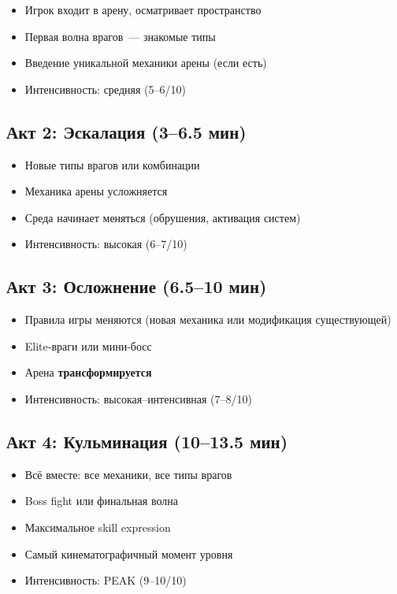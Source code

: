 \documentclass[a4paper,11pt]{report}
\begin{document}
\begin{itemize}[leftmargin=*]
  \item Игрок входит в арену, осматривает пространство
  \item Первая волна врагов~--- знакомые типы
  \item Введение уникальной механики арены (если есть)
  \item Интенсивность: средняя (5--6/10)
\end{itemize}

\subsection{Акт 2: Эскалация (3--6.5 мин)}

\begin{itemize}[leftmargin=*]
  \item Новые типы врагов или комбинации
  \item Механика арены усложняется
  \item Среда начинает меняться (обрушения, активация систем)
  \item Интенсивность: высокая (6--7/10)
\end{itemize}

\subsection{Акт 3: Осложнение (6.5--10 мин)}

\begin{itemize}[leftmargin=*]
  \item Правила игры меняются (новая механика или
    модификация существующей)
  \item Elite-враги или мини-босс
  \item Арена \textbf{трансформируется}
  \item Интенсивность: высокая--интенсивная (7--8/10)
\end{itemize}

\subsection{Акт 4: Кульминация (10--13.5 мин)}

\begin{itemize}[leftmargin=*]
  \item Всё вместе: все механики, все типы врагов
  \item Boss fight или финальная волна
  \item Максимальное skill expression
  \item Самый кинематографичный момент уровня
  \item Интенсивность: PEAK (9--10/10)
\end{itemize}
\end{document}
